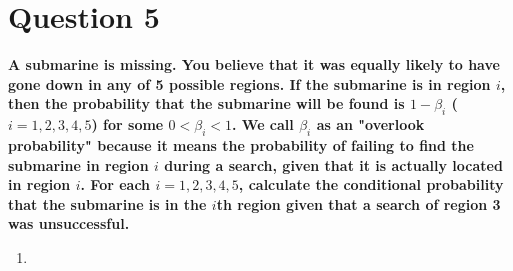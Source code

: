 \documentclass[11pt]{article}
\begin{document}
\clearpage
\section*{Question 5}

    \textbf{A submarine is missing. You believe that it was equally likely to have gone down in any of 5 possible regions. If the submarine is in region $i$, then the probability that the submarine will be found is $1 - \beta_i$ ($i=1,2,3,4,5$) for some $0 < \beta_i < 1$. We call $\beta_i$ as an "overlook probability" because it means the probability of failing to find the submarine in region $i$ during a search, given that it is actually located in region $i$. For each $i=1,2,3,4,5$, calculate the conditional probability that the submarine is in the $i$th region given that a search of region 3 was unsuccessful.}
    \begin{enumerate}[label=(\alph*)]
        \item[] 
    \end{enumerate}
\end{document}
